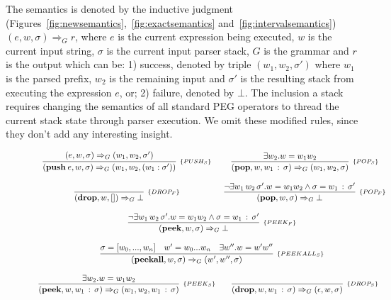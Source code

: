 \documentclass[preprint,12pt]{elsarticle}
\theoremstyle{definition}
\begin{document}
The semantics is denoted by the inductive judgment
(Figures~\ref{fig:newsemantics},~\ref{fig:exactsemantics} and~\ref{fig:intervalsemantics})
$(e, w, \sigma) \Rightarrow_G r$,
where $e$ is the current expression being executed, $w$ is the current input string,
$\sigma$ is the current input parser stack, $G$ is the grammar and $r$ is the output
which can be: 1) success, denoted by triple $(w_1,w_2,\sigma')$ where $w_1$
is the parsed prefix, $w_2$ is the remaining input and $\sigma'$ is the resulting
stack from executing the expression $e$, or; 2) failure, denoted by $\bot$.
The inclusion a stack requires changing the semantics of all standard PEG
operators to thread the current stack state through parser execution.
We omit these modified rules, since they don't add any interesting insight.
\begin{figure}[h!]
  \[
    \begin{array}{cc}
      \infer[_{\{PUSH_S\}}]
             {(\mathbf{push}\:e,w,\sigma) \Rightarrow_G (w_1, w_2, (w_1:\sigma'))}
             {(e,w,\sigma)\Rightarrow_G (w_1,w_2,\sigma')} &
      \infer[_{\{POP_S\}}]
            {(\mathbf{pop},w,w_1\,:\,\sigma)\Rightarrow_G (w_1,w_2,\sigma)}
            {\exists w_2. w = w_1w_2} \\ \\
        \infer[_{\{DROP_F\}}]
              {(\mathbf{drop},w,[])\Rightarrow_G \bot}{} &
      \infer[_{\{POP_F\}}]
            {(\mathbf{pop},w,\sigma)\Rightarrow_G \bot}
            {\neg \exists w_1\,w_2\, \sigma'. w = w_1w_2 \land \sigma = w_1\,:\,\sigma'}\\ \\
      \multicolumn{2}{c}{
        \infer[_{\{PEEK_F\}}]
              {(\mathbf{peek},w,\sigma)\Rightarrow_G \bot}
              {\neg \exists w_1\,w_2\, \sigma'. w = w_1w_2 \land \sigma = w_1\,:\,\sigma'}
      }\\\\
      \multicolumn{2}{c}{
        \infer[_{\{PEEKALL_S\}}]
              {(\mathbf{peekall},w,\sigma)\Rightarrow_G (w', w'',\sigma)}
              {\sigma = [w_0, ..., w_n] & w' = w_0...w_n & \exists w'' . w = w'w''}
      }\\ \\
      \infer[_{\{PEEK_S\}}]
              {(\mathbf{peek},w,w_1\,:\,\sigma)\Rightarrow_G (w_1,w_2,w_1 \,:\,\sigma)}
              {\exists w_2. w = w_1w_2} &
      \infer[_{\{DROP_S\}}]
            {(\mathbf{drop},w,w_1\,:\,\sigma)\Rightarrow_G (\epsilon,w,\sigma)}
            {}\\ \\

\end{array}\]
\end{figure}
\end{document}
